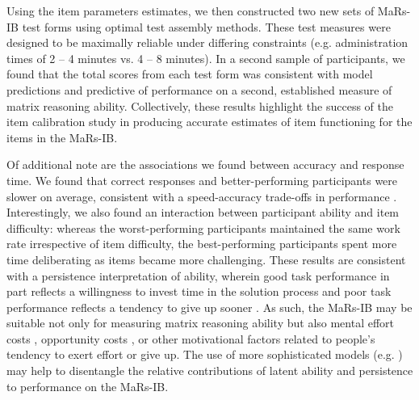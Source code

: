 \documentclass[a4paper,man,natbib]{apa6}
\begin{document}
Using the item parameters estimates, we then constructed two new sets of MaRs-IB test forms using optimal test assembly methods. These test measures were designed to be maximally reliable under differing constraints (e.g. administration times of 2 -- 4 minutes vs. 4 -- 8 minutes). In a second sample of participants, we found that the total scores from each test form was consistent with model predictions and predictive of performance on a second, established measure of matrix reasoning ability. Collectively, these results highlight the success of the item calibration study in producing accurate estimates of item functioning for the items in the MaRs-IB. 

Of additional note are the associations we found between accuracy and response time. We found that correct responses and better-performing participants were slower on average, consistent with a speed-accuracy trade-offs in performance \citep{heitz2014speed}. Interestingly, we also found an interaction between participant ability and item difficulty: whereas the worst-performing participants maintained the same work rate irrespective of item difficulty, the best-performing participants spent more time deliberating as items became more challenging. These results are consistent with a persistence interpretation of ability, wherein good task performance in part reflects a willingness to invest time in the solution process and poor task performance reflects a tendency to give up sooner \citep{ranger2021effects}. As such, the MaRs-IB may be suitable not only for measuring matrix reasoning ability but also mental effort costs \citep{kool2018mental}, opportunity costs \citep{payne1996time}, or other motivational factors \citep{duckworth2011role} related to people's tendency to exert effort or give up. The use of more sophisticated models (e.g. \citealt{ranger2014accumulator}) may help to disentangle the relative contributions of latent ability and persistence to performance on the MaRs-IB.
\end{document}
